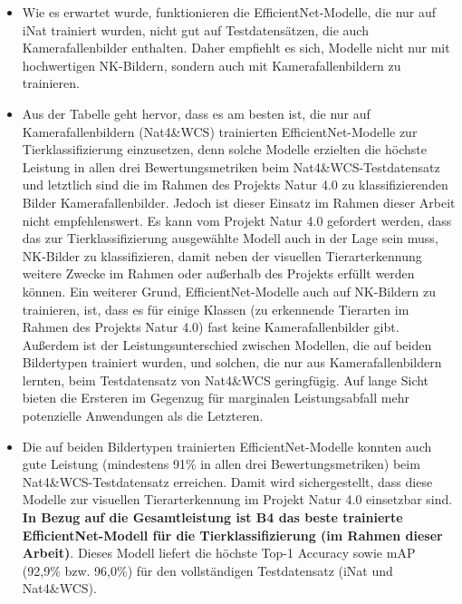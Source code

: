 \begin{itemize}	
	\item Wie es erwartet wurde, funktionieren die EfficientNet-Modelle, die nur auf iNat trainiert wurden, nicht gut auf Testdatensätzen, die auch Kamerafallenbilder enthalten. Daher empfiehlt es sich, Modelle nicht nur mit hochwertigen NK-Bildern, sondern auch mit Kamerafallenbildern zu trainieren. 
	
	\item Aus der Tabelle geht hervor, dass es am besten ist, die nur auf Kamerafallenbildern (Nat4\&WCS) trainierten EfficientNet-Modelle zur Tierklassifizierung einzusetzen, denn solche Modelle erzielten die höchste Leistung in allen drei Bewertungsmetriken beim Nat4\&WCS-Testdatensatz und letztlich sind die im Rahmen des Projekts Natur 4.0 zu klassifizierenden Bilder Kamerafallenbilder. Jedoch ist dieser Einsatz im Rahmen dieser Arbeit nicht empfehlenswert. Es kann vom Projekt Natur 4.0 gefordert werden, dass das zur Tierklassifizierung ausgewählte Modell auch in der Lage sein muss, NK-Bilder zu klassifizieren, damit neben der visuellen Tierarterkennung weitere Zwecke im Rahmen oder außerhalb des Projekts erfüllt werden können. Ein weiterer Grund, EfficientNet-Modelle auch auf NK-Bildern zu trainieren, ist, dass es für einige Klassen (zu erkennende Tierarten im Rahmen des Projekts Natur 4.0) fast keine Kamerafallenbilder gibt. Außerdem ist der Leistungsunterschied zwischen Modellen, die auf beiden Bildertypen trainiert wurden, und solchen, die nur aus Kamerafallenbildern lernten, beim Testdatensatz von Nat4\&WCS geringfügig. Auf lange Sicht bieten die Ersteren im Gegenzug für marginalen Leistungsabfall mehr potenzielle Anwendungen als die Letzteren.
	
	\item Die auf beiden Bildertypen trainierten EfficientNet-Modelle konnten auch gute Leistung (mindestens 91\% in allen drei Bewertungsmetriken) beim Nat4\&WCS-Testdatensatz erreichen. Damit wird sichergestellt, dass diese Modelle zur visuellen Tierarterkennung im Projekt Natur 4.0 einsetzbar sind. \textbf{In Bezug auf die Gesamtleistung ist B4 das beste trainierte EfficientNet-Modell für die Tierklassifizierung (im Rahmen dieser Arbeit)}. Dieses Modell liefert die höchste Top-1 Accuracy sowie mAP (92,9\% bzw. 96,0\%) für den vollständigen Testdatensatz (iNat und Nat4\&WCS).
	
	
\end{itemize}


